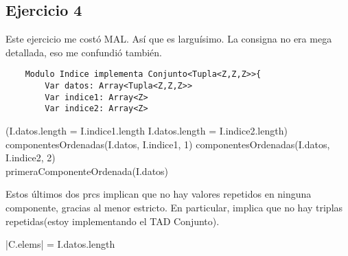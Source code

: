 \documentclass[10pt,a4paper]{article}
\begin{document}
\subsection{Ejercicio 4}
Este ejercicio me costó MAL. Así que es larguísimo. La consigna no era mega detallada, eso me confundió también.

\begin{lstlisting}
	Modulo Indice implementa Conjunto<Tupla<Z,Z,Z>>{
		Var datos: Array<Tupla<Z,Z,Z>>
		Var indice1: Array<Z>
		Var indice2: Array<Z>
\end{lstlisting}

{(I.datos.length = I.indice1.length \land I.datos.length = I.indice2.length) \yLuego \\
 \land
componentesOrdenadas(I.datos, I.indice1, 1) \land componentesOrdenadas(I.datos, I.indice2, 2) \land \\
primeraComponenteOrdenada(I.datos)}

{}

{}

Estos últimos dos prcs implican que no hay valores repetidos en ninguna componente, gracias al menor estricto.
En particular, implica que no hay triplas repetidas(estoy implementando el TAD Conjunto).

{|C.elems| = I.datos.length \land \\ 
}
\end{document}
